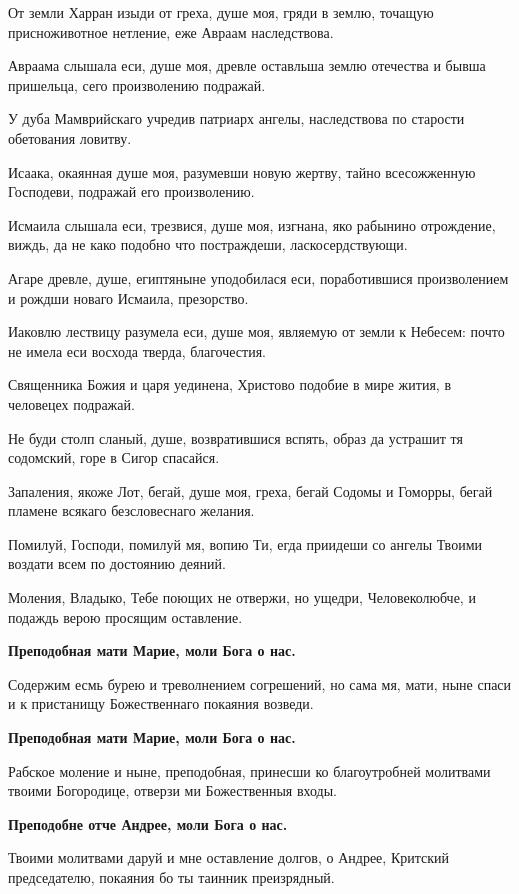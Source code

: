 От земли Харран изыди от греха, душе моя, гряди в землю, точащую присноживотное нетление, еже Авраам наследствова.


Авраама слышала еси, душе моя, древле оставльша землю отечества и бывша пришельца, сего произволению подражай.


У дуба Мамврийскаго учредив патриарх ангелы, наследствова по старости обетования ловитву.


Исаака, окаянная душе моя, разумевши новую жертву, тайно всесожженную Господеви, подражай его произволению.


Исмаила слышала еси, трезвися, душе моя, изгнана, яко рабынино отрождение, виждь, да не како подобно что постраждеши, ласкосердствующи.


Агаре древле, душе, египтяныне уподобилася еси, поработившися произволением и рождши новаго Исмаила, презорство.


Иаковлю лествицу разумела еси, душе моя, являемую от земли к Небесем: почто не имела еси восхода тверда, благочестия.


Священника Божия и царя уединена, Христово подобие в мире жития, в человецех подражай.


Не буди столп сланый, душе, возвратившися вспять, образ да устрашит тя содомский, горе в Сигор спасайся.


Запаления, якоже Лот, бегай, душе моя, греха, бегай Содомы и Гоморры, бегай пламене всякаго безсловеснаго желания.


Помилуй, Господи, помилуй мя, вопию Ти, егда приидеши со ангелы Твоими воздати всем по достоянию деяний.


Моления, Владыко, Тебе поющих не отвержи, но ущедри, Человеколюбче, и подаждь верою просящим оставление.


\bfseries Преподобная мати Марие, моли Бога о нас.\normalfont{}


Содержим есмь бурею и треволнением согрешений, но сама мя, мати, ныне спаси и к пристанищу Божественнаго покаяния возведи.


\bfseries Преподобная мати Марие, моли Бога о нас.\normalfont{}


Рабское моление и ныне, преподобная, принесши ко благоутробней молитвами твоими Богородице, отверзи ми Божественныя входы.


\bfseries Преподобне отче Андрее, моли Бога о нас.\normalfont{}


Твоими молитвами даруй и мне оставление долгов, о Андрее, Критский председателю, покаяния бо ты таинник преизрядный.



